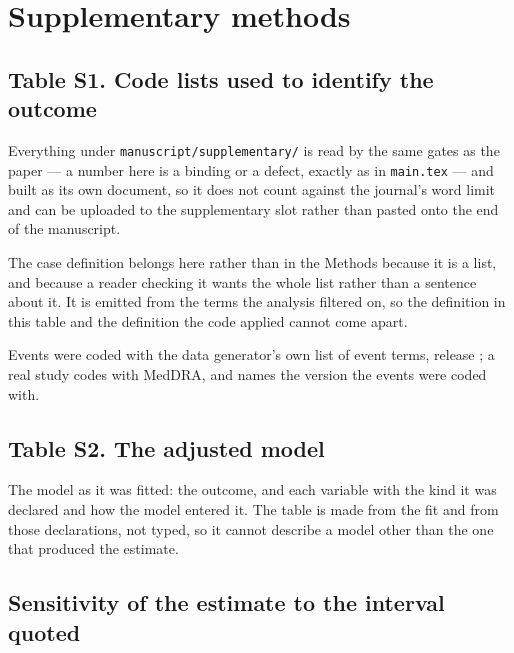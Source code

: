 \documentclass{article}
\begin{document}
\section{Supplementary methods}

\subsection{Table S1. Code lists used to identify the outcome}

Everything under \texttt{manuscript/supplementary/} is read by the same gates as the paper ---
a number here is a binding or a defect, exactly as in \texttt{main.tex} --- and built as its
own document, so it does not count against the journal's word limit and can be uploaded to
the supplementary slot rather than pasted onto the end of the manuscript.

The case definition belongs here rather than in the Methods because it is a list, and because
a reader checking it wants the whole list rather than a sentence about it. It is emitted from
the terms the analysis filtered on, so the definition in this table and the definition the
code applied cannot come apart.

\begin{table}\caption{Code lists used to identify the outcome.}\label{tab:codes}\end{table}

Events were coded with the data generator's own list of event terms, release
; a real study codes with MedDRA, and names the
version the events were coded with.

\subsection{Table S2. The adjusted model}

The model as it was fitted: the outcome, and each variable with the kind it was declared and
how the model entered it. The table is made from the fit and from those declarations, not
typed, so it cannot describe a model other than the one that produced the estimate.

\begin{table}\caption{The adjusted model.}\label{tab:model}\end{table}

\subsection{Sensitivity of the estimate to the interval quoted}
\end{document}
